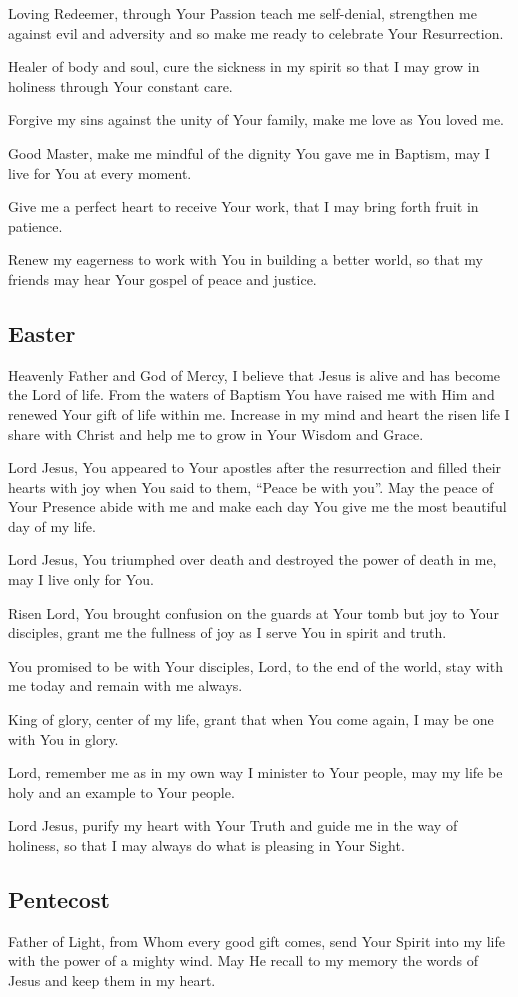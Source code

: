 \documentclass[12pt]{article}
\newcommand{\prayertitle}[1]{\subsection{#1}}
\begin{document}
Loving Redeemer, through Your Passion teach me self-denial, strengthen me against evil and adversity and so make me ready to celebrate Your Resurrection.

Healer of body and soul, cure the sickness in my spirit so that I may grow in holiness through Your constant care.

Forgive my sins against the unity of Your family, make me love as You loved me.

Good Master, make me mindful of the dignity You gave me in Baptism, may I live for You at every moment.

Give me a perfect heart to receive Your work, that I may bring forth fruit in patience.

Renew my eagerness to work with You in building a better world, so that my friends may hear Your gospel of peace and justice.

\prayertitle{Easter}
Heavenly Father and God of Mercy, I believe that Jesus is alive and has become the Lord of life.
From the waters of Baptism You have raised me with Him and renewed Your gift of life within me.
Increase in my mind and heart the risen life I share with Christ and help me to grow in Your Wisdom and Grace.

Lord Jesus, You appeared to Your apostles after the resurrection and filled their hearts with joy when You said to them, ``Peace be with you''.
May the peace of Your Presence abide with me and make each day You give me the most beautiful day of my life.

Lord Jesus, You triumphed over death and destroyed the power of death in me, may I live only for You.

Risen Lord, You brought confusion on the guards at Your tomb but joy to Your disciples, grant me the fullness of joy as I serve You in spirit and truth.

You promised to be with Your disciples, Lord, to the end of the world, stay with me today and remain with me always.

King of glory, center of my life, grant that when You come again, I may be one with You in glory.

Lord, remember me as in my own way I minister to Your people, may my life be holy and an example to Your people.

Lord Jesus, purify my heart with Your Truth and guide me in the way of holiness, so that I may always do what is pleasing in Your Sight.

\prayertitle{Pentecost}
Father of Light, from Whom every good gift comes, send Your Spirit into my life with the power of a mighty wind.
May He recall to my memory the words of Jesus and keep them in my heart.
\end{document}
